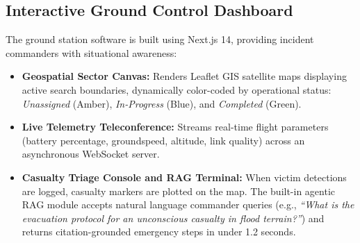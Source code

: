 \subsection{Interactive Ground Control Dashboard}
The ground station software is built using Next.js 14, providing incident commanders with situational awareness:
\begin{itemize}
    \item \textbf{Geospatial Sector Canvas:} Renders Leaflet GIS satellite maps displaying active search boundaries, dynamically color-coded by operational status: \textit{Unassigned} (Amber), \textit{In-Progress} (Blue), and \textit{Completed} (Green).
    \item \textbf{Live Telemetry Teleconference:} Streams real-time flight parameters (battery percentage, groundspeed, altitude, link quality) across an asynchronous WebSocket server.
    \item \textbf{Casualty Triage Console and RAG Terminal:} When victim detections are logged, casualty markers are plotted on the map. The built-in agentic RAG module accepts natural language commander queries (e.g., \textit{``What is the evacuation protocol for an unconscious casualty in flood terrain?''}) and returns citation-grounded emergency steps in under 1.2 seconds.
\end{itemize}
